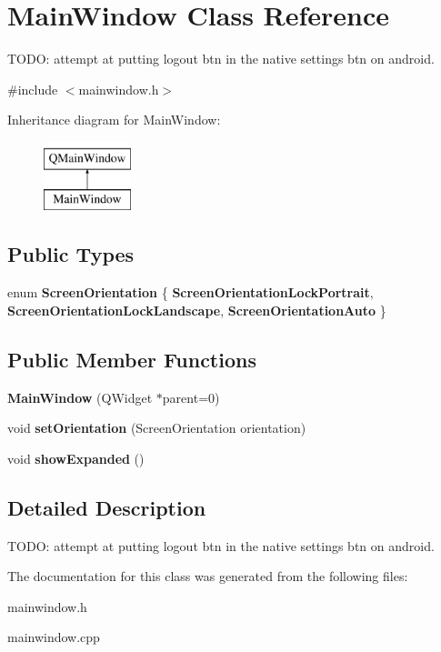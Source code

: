 \hypertarget{classMainWindow}{\section{Main\-Window Class Reference}
\label{classMainWindow}
}


T\-O\-D\-O\-: attempt at putting logout btn in the native settings btn on android.  




{\ttfamily \#include $<$mainwindow.\-h$>$}

Inheritance diagram for Main\-Window\-:\begin{figure}[H]
\begin{center}
\leavevmode
\includegraphics[height=2.000000cm]{classMainWindow}
\end{center}
\end{figure}
\subsection*{Public Types}
\begin{DoxyCompactItemize}
\item 
enum {\bfseries Screen\-Orientation} \{ {\bfseries Screen\-Orientation\-Lock\-Portrait}, 
{\bfseries Screen\-Orientation\-Lock\-Landscape}, 
{\bfseries Screen\-Orientation\-Auto}
 \}
\end{DoxyCompactItemize}
\subsection*{Public Member Functions}
\begin{DoxyCompactItemize}
\item 
\hypertarget{classMainWindow_a8b244be8b7b7db1b08de2a2acb9409db}{{\bfseries Main\-Window} (Q\-Widget $\ast$parent=0)}\label{classMainWindow_a8b244be8b7b7db1b08de2a2acb9409db}

\item 
\hypertarget{classMainWindow_a9597b97cef9da0760a06e8e04ca3d138}{void {\bfseries set\-Orientation} (Screen\-Orientation orientation)}\label{classMainWindow_a9597b97cef9da0760a06e8e04ca3d138}

\item 
\hypertarget{classMainWindow_ae66038a9d909fd409d781bf7c3f3ff2c}{void {\bfseries show\-Expanded} ()}\label{classMainWindow_ae66038a9d909fd409d781bf7c3f3ff2c}

\end{DoxyCompactItemize}


\subsection{Detailed Description}
T\-O\-D\-O\-: attempt at putting logout btn in the native settings btn on android. 

The documentation for this class was generated from the following files\-:\begin{DoxyCompactItemize}
\item 
mainwindow.\-h\item 
mainwindow.\-cpp\end{DoxyCompactItemize}
